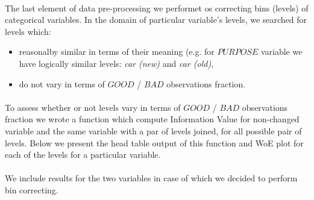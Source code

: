 \documentclass[10pt]{article}\usepackage[]{graphicx}\usepackage[]{color}
\begin{document}
\paragraph{}
The last element of data pre-processing we performet os correcting bins (levels) of categorical variables. In the domain of particular variable's levels, we searched for levels which: 
\begin{itemize}
\item reasonalby similar in terms of their meaning (e.g. for $PURPOSE$ variable we have logically similar levels: \textit{car (new)} and \textit{car (old)},
\item do not vary in terms of $GOOD$ / $BAD$ observations fraction.
\end{itemize}
\paragraph{}
To assess whether or not levels vary in terms of $GOOD$ / $BAD$ observations fraction we wrote a function which compute Information Value for non-changed variable and the same variable with a par of levels joined, for all possible pair of levels. Below we present the head table output of this function and WoE plot for each of the levels for a particular variable.
\paragraph{}
We include results for the two variables in case of which we decided to perform bin correcting. 
\end{document}
